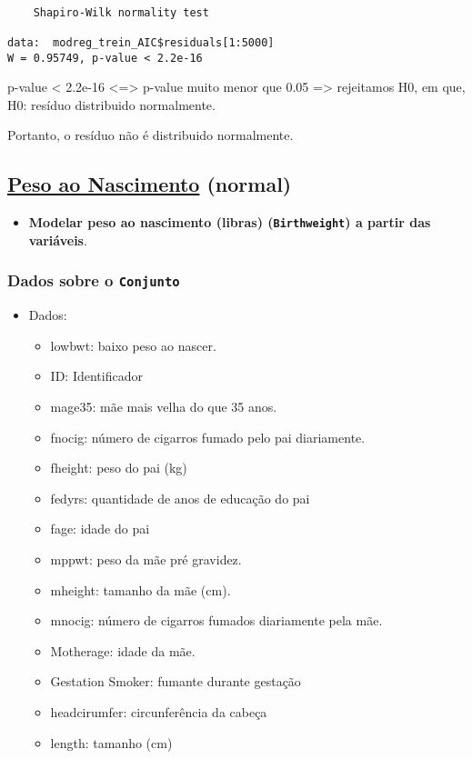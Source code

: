 \documentclass[11pt]{article}
\begin{document}
\begin{enumerate}
\begin{verbatim}

	Shapiro-Wilk normality test

data:  modreg_trein_AIC$residuals[1:5000]
W = 0.95749, p-value < 2.2e-16

\end{verbatim}


p-value < 2.2e-16 <=> p-value muito menor que 0.05 => rejeitamos H0, em que, H0: resíduo distribuido normalmente.

Portanto, o resíduo não é distribuido normalmente.
\end{enumerate}

\subsection{\href{https://www.sheffield.ac.uk/mash/statistics/datasets}{Peso ao Nascimento}  (normal)}
\label{sec:org9f1bcd7}
\begin{itemize}
\item \textbf{Modelar peso ao nascimento (libras) (\texttt{Birthweight}) a partir das variáveis}.
\end{itemize}
\subsubsection{Dados sobre o \texttt{Conjunto}}
\label{sec:org0f40dee}
\begin{itemize}
\item Dados:
\begin{itemize}
\item lowbwt: baixo peso ao nascer.
\item ID: Identificador
\item mage35: mãe mais velha do que 35 anos.
\item fnocig: número de cigarros fumado pelo pai diariamente.
\item fheight: peso do pai (kg)
\item fedyrs: quantidade de anos de educação do pai
\item fage: idade do pai
\item mppwt: peso da mãe pré gravidez.
\item mheight: tamanho da mãe (cm).
\item mnocig: número de cigarros fumados diariamente pela mãe.
\item Motherage: idade da mãe.
\item Gestation Smoker: fumante durante gestação
\item headcirumfer: circunferência da cabeça
\item length: tamanho (cm)
\end{itemize}
\end{itemize}
\end{document}
